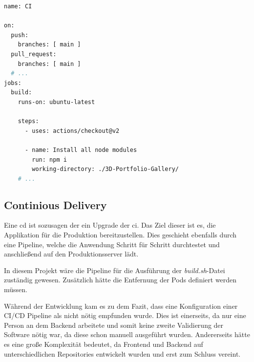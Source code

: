\begin{lstlisting}[label=lst:cipipeline, language=bash, caption=Pipeline einer CI]
name: CI

on:
  push:
    branches: [ main ]
  pull_request:
    branches: [ main ]
  # ...
jobs:
  build:
    runs-on: ubuntu-latest

    steps:
      - uses: actions/checkout@v2

      - name: Install all node modules
        run: npm i 
        working-directory: ./3D-Portfolio-Gallery/
    # ...

\end{lstlisting}

\subsection{Continious Delivery}

Eine \gls{cd} ist sozusagen der ein Upgrade der \gls{ci}. 
Das Ziel dieser ist es, die Applikation für die Produktion bereitzustellen. 
Dies geschieht ebenfalls durch eine Pipeline, welche die Anwendung Schritt für Schritt durchtestet und anschließend auf den Produktionsserver lädt. 
\cite{cicdabout}

In diesem Projekt wäre die Pipeline für die Ausführung der \emph{build.sh}-Datei zuständig gewesen. 
Zusätzlich hätte die Entfernung der Pods definiert werden müssen. 

Während der Entwicklung kam es zu dem Fazit, dass eine Konfiguration einer CI/CD Pipeline als nicht nötig empfunden wurde. 
Dies ist einerseits, da nur eine Person an dem Backend arbeitete und somit keine zweite Validierung der Software nötig war, da diese schon manuell ausgeführt wurden. 
Andererseits hätte es eine große Komplexität bedeutet, da Frontend und Backend auf unterschiedlichen Repositories entwickelt wurden und erst zum Schluss vereint. 
 